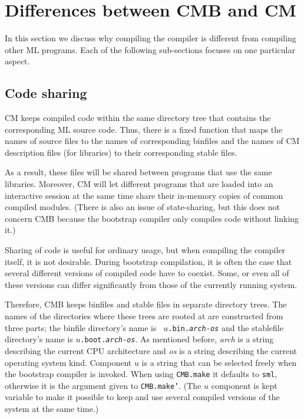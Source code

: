 
\section{Differences between CMB and CM}

In this section we discuss why compiling the compiler is different
from compiling other ML programs.  Each of the following sub-sections
focuses on one particular aspect.

\subsection{Code sharing}

CM keeps compiled code within the same directory tree that contains
the corresponding ML source code.  Thus, there is a fixed function
that maps the names of source files to the names of corresponding
binfiles and the names of CM description files (for libraries) to
their corresponding stable files.

As a result, these files will be shared between programs that use the
same libraries.  Moreover, CM will let different programs that are
loaded into an interactive session at the same time share their
in-memory copies of common compiled modules.  (There is also an issue of
state-sharing, but this does not concern CMB because the bootstrap
compiler only compiles code without linking it.)

Sharing of code is useful for ordinary usage, but when compiling the
compiler itself, it is not desirable.  During bootstrap compilation,
it is often the case that several different versions of compiled code
have to coexist.  Some, or even all of these versions can differ
significantly from those of the currently running system.

Therefore, CMB keeps binfiles and stable files in separate directory
trees.  The names of the directories where these trees are rooted at
are constructed from three parts; the binfile directory's name is {\tt
$u$.bin.{\it arch}-{\it os}} and the stablefile directory's name is
{\tt $u$.boot.{\it arch}-{\it os}}.  As mentioned before, {\it arch}
is a string describing the current CPU architecture and {\it os} is a
string describing the current operating system kind. Component $u$ is
a string that can be selected freely when the bootstrap compiler is
invoked.  When using {\tt CMB.make} it defaults to {\tt sml},
otherwise it is the argument given to {\tt CMB.make'}.  (The $u$
component is kept variable to make it possible to keep and use several
compiled versions of the system at the same time.)

